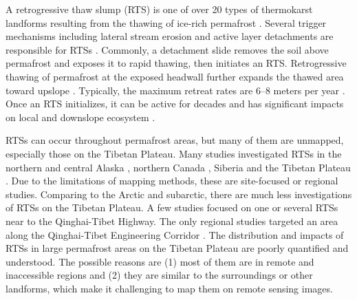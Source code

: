 \documentclass[preprint,12pt,authoryear]{elsarticle}
\begin{document}
A retrogressive thaw slump (RTS) is one of over 20 types of thermokarst landforms resulting from the thawing of ice-rich permafrost \citep{czudek_thermokarst_1970, jorgenson_response_2005, jorgenson_thermokarst_2013,kokelj2013advances}. Several trigger mechanisms including lateral stream erosion and active layer detachments are responsible for RTSs \citep{french2017periglacial}. Commonly, a detachment slide removes the soil above permafrost and exposes it to rapid thawing, then initiates an RTS. Retrogressive thawing of permafrost at the exposed headwall further expands the thawed area toward upslope \citep{jorgenson_thermokarst_2013}. Typically, the maximum retreat rates are 6--8 meters per year \citep{jorgenson_thermokarst_2013}. Once an RTS initializes, it can be active for decades \citep{burn1989geomorphology, lacelle2010climatic, swanson2018growth} and has significant impacts on local and downslope ecosystem \citep{gooseff2009effects, pierre2018unprecedented, zolkos2018mineral}. %

RTSs can occur throughout permafrost areas, but many of them are unmapped, especially those on the Tibetan Plateau. Many studies investigated RTSs in the northern and central Alaska \citep{swanson2018growth,gooseff2009effects,balser2014timing}, northern Canada \citep{burn1989geomorphology, lacelle2010climatic, ramage_terrain_2017, lantuit_fifty_2008, lacelle_distribution_2015, segal2016acceleration, brooker2014investigating, kokelj2017climate, obu2017coastal, ramage_increasing_2018, lantz2008increasing, brooker2014mapping, frappier2017retrogressive, zwieback2018sub, rudy2017terrain, armstrong2018thaw, kokelj2013thawing, rudy2016transferability, burn1990canadian,  cassidy2017impacts}, Siberia \citep{czudek_thermokarst_1970, zwieback2018sub, leibman2003dynamics} and the Tibetan Plateau \citep{wang1995situ, niu2005engineering, niu2012development, niu2014thaw, niu2016thaw, sun2017creep, ma2006slope}. Due to the limitations of mapping methods, these are site-focused or regional studies. Comparing to the Arctic and subarctic, there are much less investigations of RTSs on the Tibetan Plateau. A few studies focused on one or several RTSs near to the Qinghai-Tibet Highway. The only regional studies targeted an area along the Qinghai-Tibet Engineering Corridor \citep{niu2014thaw, niu2016thaw}. The distribution and impacts of RTSs in large permafrost areas on the Tibetan Plateau are poorly quantified and understood. The possible reasons are (1) most of them are in remote and inaccessible regions and (2) they are similar to the surroundings or other landforms, which make it challenging to map them on remote sensing images.  %
\end{document}
